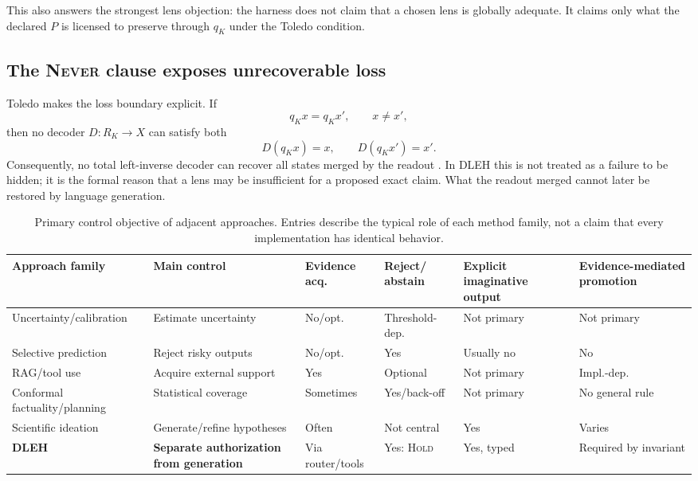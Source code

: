 \documentclass[10pt,twocolumn]{article}
\begin{document}
This also answers the strongest lens objection: the harness does not claim that a chosen lens is globally adequate. It claims only what the declared $P$ is licensed to preserve through $q_K$ under the Toledo condition.

\subsection{The \textsc{Never} clause exposes unrecoverable loss}
Toledo makes the loss boundary explicit. If
\begin{equation}
q_K x = q_K x', \qquad x \neq x',
\end{equation}
then no decoder $D : R_K \to X$ can satisfy both
\begin{equation}
D(q_K x) = x, \qquad D(q_K x') = x'.
\end{equation}
Consequently, no total left-inverse decoder can recover all states merged by the readout \cite{lahtee2026toledo,lahtee2026idm}. In DLEH this is not treated as a failure to be hidden; it is the formal reason that a lens may be insufficient for a proposed exact claim. What the readout merged cannot later be restored by language generation.

\begin{table}[t]
\centering\footnotesize
\caption{Primary control objective of adjacent approaches. Entries describe the typical role of each method family, not a claim that every implementation has identical behavior.}
\label{tab:related}
\begin{tabular}{@{}p{2.7cm}p{2.4cm}p{1.7cm}p{1.6cm}p{2.3cm}p{2.4cm}@{}}
\toprule
Approach family & Main control & Evidence acq. & Reject/ abstain & Explicit imaginative output & Evidence-mediated promotion\\
\midrule
Uncertainty/calibration & Estimate uncertainty & No/opt. & Threshold-dep. & Not primary & Not primary\\
Selective prediction & Reject risky outputs & No/opt. & Yes & Usually no & No\\
RAG/tool use & Acquire external support & Yes & Optional & Not primary & Impl.-dep.\\
Conformal factuality/planning & Statistical coverage & Sometimes & Yes/back-off & Not primary & No general rule\\
Scientific ideation & Generate/refine hypotheses & Often & Not central & Yes & Varies\\
\textbf{DLEH} & \textbf{Separate authorization from generation} & Via router/tools & Yes: \textsc{Hold} & Yes, typed & Required by invariant\\
\bottomrule
\end{tabular}
\end{table}
\end{document}
